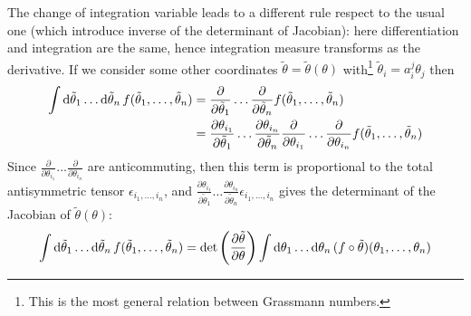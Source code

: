\documentclass[../main/main.tex]{subfiles}
\begin{document}
The change of integration variable leads to a different rule respect to the usual one (which introduce inverse of the determinant of Jacobian): here differentiation and integration are the same, hence integration measure transforms as the derivative. If we consider some other coordinates $\tilde \theta=\tilde\theta(\theta)$ with\footnote{This is the most general relation between Grassmann numbers.} $\tilde\theta_i=a_i^j\theta_j$ then
\begin{align*}
\int\textup{d}\tilde\theta_1\dots\textup{d}\tilde\theta_n\,f(\tilde\theta_1,\dots,\tilde\theta_n)
&=\frac{\partial}{\partial\tilde\theta_1}\dots\frac{\partial}{\partial\tilde\theta_n}f(\tilde\theta_1,\dots,\tilde\theta_n)\\
&=\frac{\partial\theta_{i_1}}{\partial\tilde\theta_1}\dots\frac{\partial\theta_{i_n}}{\partial\tilde\theta_n}\frac{\partial}{\partial\theta_{i_1}}\dots\frac{\partial}{\partial\theta_{i_n}}f(\tilde\theta_1,\dots,\tilde\theta_n)
\end{align*}
Since $\frac{\partial}{\partial\theta_{i_1}}\dots\frac{\partial}{\partial\theta_{i_n}}$ are anticommuting, then this term is proportional to the total antisymmetric tensor $\epsilon_{i_1,\dots,i_n}$, and $\frac{\partial\theta_{i_1}}{\partial\tilde\theta_1}\dots\frac{\partial\theta_{i_n}}{\partial\tilde\theta_n}\epsilon_{i_1,\dots,i_n}$ gives the determinant of the Jacobian of $\tilde\theta(\theta)$:
\[\int\textup{d}\tilde\theta_1\dots\textup{d}\tilde\theta_n\,f(\tilde\theta_1,\dots,\tilde\theta_n)
=\det \left(\frac{\partial\tilde\theta}{\partial\theta}\right)\int\textup{d}\theta_1\dots\textup{d}\theta_n\,(f\circ\tilde\theta)(\theta_1,\dots,\theta_n)\]
\end{document}
